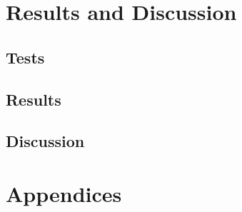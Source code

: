 \documentclass{report}
\begin{document}
\part{Results and Discussion}

\chapter{Tests}
	

\chapter{Results}
	

\chapter{Discussion}
	

\printindex
\printglossaries

\part{Appendices}
	



\nocite{*}
\end{document}
